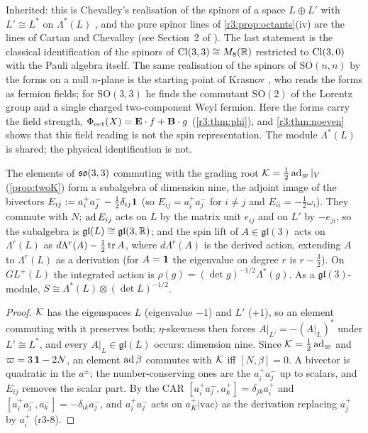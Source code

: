 Inherited: this is Chevalley's realisation of the spinors of a space $L\oplus L'$ with $L'\cong L^*$ on $\Lambda^*(L)$
\cite{Chevalley54,LawsonMichelsohn}, and the pure spinor lines of \cref{r3:prop:octants}(iv) are the lines of Cartan and Chevalley (see Section~2
of \cite{Gualtieri03}). The last statement is the classical identification of the spinors of $\mathrm{Cl}(3,3)\cong M_8(\mathbb{R})$ restricted to
$\mathrm{Cl}(3,0)$ with the Pauli algebra itself. The same realisation of the spinors of $\mathrm{SO}(n,n)$ by the forms on a null $n$-plane is the
starting point of Krasnov \cite{Krasnov18}, who reads the forms as fermion fields; for $\mathrm{SO}(3,3)$ he finds the commutant
$\mathrm{SO}(2)$ of the Lorentz group and a single charged two-component Weyl fermion. Here the forms carry the field strength,
$\Phi_{\rm oct}(X)=\mathbf E\cdot f+\mathbf B\cdot g$ (\cref{r3:thm:phi}), and \cref{r3:thm:noeven} shows that this field reading is not the spin representation.
The module $\Lambda^*(L)$ is shared; the physical identification is not.

\begin{proposition}
\label{r3:prop:gl3}
The elements of $\mathfrak{so}(3,3)$ commuting with the grading root $\mathcal K=\tfrac12\operatorname{ad}_{\varpi}|_V$ (\cref{prop:twoK}) form a subalgebra of dimension nine, the adjoint image of the bivectors
$E_{ij}:=a^+_ia^-_j-\tfrac12\delta_{ij}\mathbf 1$ (so $E_{ij}=a^+_ia^-_j$ for $i\neq j$ and $E_{ii}=-\tfrac12\omega_i$). They commute with $N$; $\operatorname{ad} E_{ij}$ acts
on $L$ by the matrix unit $e_{ij}$ and on $L'$ by $-e_{ji}$, so the subalgebra is $\mathfrak{gl}(L)\cong\mathfrak{gl}(3,\mathbb{R})$; and the spin lift of
$A\in\mathfrak{gl}(3)$ acts on $\Lambda^r(L)$ as $d\Lambda^r(A)-\tfrac12\operatorname{tr} A$, where $d\Lambda^r(A)$ is the derived action, extending $A$ to
$\Lambda^r(L)$ as a derivation (for $A=\mathbf 1$ the eigenvalue on degree $r$ is $r-\tfrac32$). On $GL^+(L)$ the integrated action is
$\rho(g)=(\det g)^{-1/2}\Lambda^*(g)$. As a $\mathfrak{gl}(3)$-module, $S\cong\Lambda^*(L)\otimes(\det L)^{-1/2}$.
\end{proposition}

\begin{proof}
$\mathcal K$ has the eigenspaces $L$ (eigenvalue $-1$) and $L'$ ($+1$), so an element commuting with it preserves both; $\eta$-skewness then
forces $A|_{L'}=-(A|_L)^*$ under $L'\cong L^*$, and every $A|_L\in\mathfrak{gl}(L)$ occurs: dimension nine. Since $\mathcal K=\tfrac12\operatorname{ad}_{\varpi}$ and
$\varpi=3\,\mathbf 1-2N$, an element $\operatorname{ad}\beta$ commutes with $\mathcal K$ iff $[N,\beta]=0$. A bivector is quadratic in the $a^\pm$; the number-conserving
ones are the $a^+_ia^-_j$ up to scalars, and $E_{ij}$ removes the scalar part. By the CAR $[a^+_ia^-_j,a^+_k]=\delta_{jk}a^+_i$ and
$[a^+_ia^-_j,a^-_k]=-\delta_{ik}a^-_j$, and $a^+_ia^-_j$ acts on $a^+_K|\mathrm{vac}\rangle$ as the derivation replacing $a^+_j$ by $a^+_i$ (r3-8).
\end{proof}

